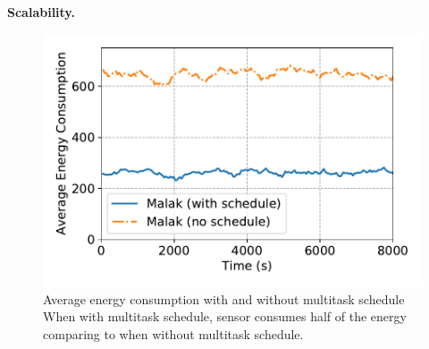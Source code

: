 \textbf{Scalability.}
\begin{figure}[htbp]
	\centering
	\includegraphics[width=.85\columnwidth]{Figure/multitask_energy}
	\vspace{-0.1in}
	\caption{Average energy consumption with and without multitask schedule
		\textnormal{When with multitask schedule, sensor consumes half of the energy
			comparing to when without multitask schedule.}}
	\label{fig:multitask_energy}
\end{figure}
